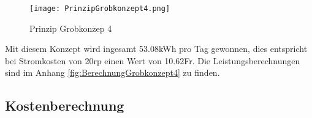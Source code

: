 \begin{figure} [H]
	\centering
	\texttt{[image: PrinzipGrobkonzept4.png]}
	\caption{Prinzip Grobkonzep 4}
	\label{fig:PrinzipGrobkonzept4}
\end{figure}

Mit diesem Konzept wird ingesamt 53.08\si{kWh} pro Tag gewonnen, dies entspricht bei Stromkosten von 20\si{rp} einen Wert von 10.62\si{Fr}. Die Leistungsberechnungen sind im Anhang \ref{fig:BerechnungGrobkonzept4}  zu finden.

\newpage

\subsection{Kostenberechnung} \label{subsec:kostenberechnung}